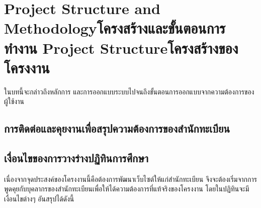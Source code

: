 \chapter{\ifproject%
\ifenglish Project Structure and Methodology\else โครงสร้างและขั้นตอนการทำงาน\fi
\else%
\ifenglish Project Structure\else โครงสร้างของโครงงาน\fi
\fi
}

ในบทนี้จะกล่าวถึงหลักการ และการออกแบบระบบไปจนถึงขั้นตอนการออกแบบจากความต้องการของผู้ใช้งาน

\makeatletter


\makeatother

\section{การติดต่อและคุยงานเพื่อสรุปความต้องการของสำนักทะเบียน}


\section{เงื่อนไขของการวางร่างปฏิทินการศึกษา}
  เนื่องจากจุดประสงค์ของโครงงานนี้คือต้องการพัฒนาเว็บไซต์ให้แก่สำนักทะเบียน
  จึงจะต้องเริ่มจากการพูดคุยกับบุคลากรของสำนักทะเบียนเพื่อให้ได้ความต้องการที่แท้จริงของโครงงาน โดยในปฏิทินจะมีเงื่อนไขต่างๆ อันสรุปได้ดังนี้

